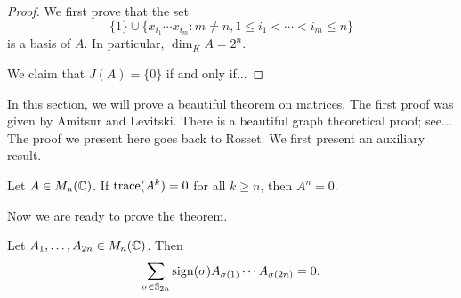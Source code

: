 \begin{proof}
    We first prove that the set
    \[
    \{1\}\cup \{x_{i_1}\cdots x_{i_m}:m\neq n,1\leq i_1<\cdots<i_m\leq n\}
    \]
    is a basis of $A$. In particular, $\dim_KA=2^n$.

    We claim that $J(A)=\{0\}$ if and only if... 
\end{proof}


In this section, we will prove a beautiful theorem 
on matrices. The first proof was given by Amitsur and Levitski. 
There is a beautiful graph theoretical proof; see...
The proof we present here goes back to Rosset. We first present 
an auxiliary result. 

\begin{exercise}
    \label{xca:traces}
    Let $A\in M_n(\mathbb{C})$. If $\operatorname{trace}(A^k)=0$ for all $k\geq n$, then 
    $A^n=0$. 
\end{exercise}

Now we are ready to prove the theorem. 

\begin{theorem}
    \label{thm:AmitsurLevitski}
    Let $A_1,\dots,A_{2n}\in M_n(\mathbb{C})$. Then 
    \[
    \sum_{\sigma\in\mathbb{S}_{2n}}\operatorname{sign}(\sigma)A_{\sigma(1)}\cdots A_{\sigma(2n)}=0.
    \]
\end{theorem}

